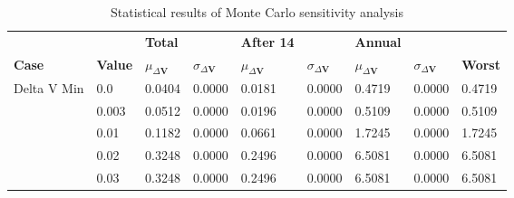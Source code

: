 \begin{table}[H]
\centering
\begin{tabular}{lllllllll}
 &  & \cellcolor[HTML]{EFEFEF}\textbf{Total} &  & \cellcolor[HTML]{EFEFEF}\textbf{After 14} & & \cellcolor[HTML]{EFEFEF}\textbf{Annual} & &\\
\rowcolor[HTML]{EFEFEF} 
\textbf{Case} & \textbf{Value} & \textbf{$\mu_{\Delta \boldsymbol{V}}$} & \textbf{$\sigma_{\Delta \boldsymbol{V}}$} & \textbf{$\mu_{\Delta \boldsymbol{V}}$} & \textbf{$\sigma_{\Delta \boldsymbol{V}}$} & \textbf{$\mu_{\Delta \boldsymbol{V}}$} & \textbf{$\sigma_{\Delta \boldsymbol{V}}$} & \textbf{Worst} \\ 
Delta V Min & 0.0 & 0.0404 & 0.0000 & 0.0181 & 0.0000 & 0.4719 & 0.0000 & 0.4719 \\ 
 & 0.003 & 0.0512 & 0.0000 & 0.0196 & 0.0000 & 0.5109 & 0.0000 & 0.5109 \\ 
 & 0.01 & 0.1182 & 0.0000 & 0.0661 & 0.0000 & 1.7245 & 0.0000 & 1.7245 \\ 
 & 0.02 & 0.3248 & 0.0000 & 0.2496 & 0.0000 & 6.5081 & 0.0000 & 6.5081 \\ 
 & 0.03 & 0.3248 & 0.0000 & 0.2496 & 0.0000 & 6.5081 & 0.0000 & 6.5081 \\ 
\end{tabular}
\caption{Statistical results of Monte Carlo sensitivity analysis}
\label{tab:SensitivityAnalysis}
\end{table}